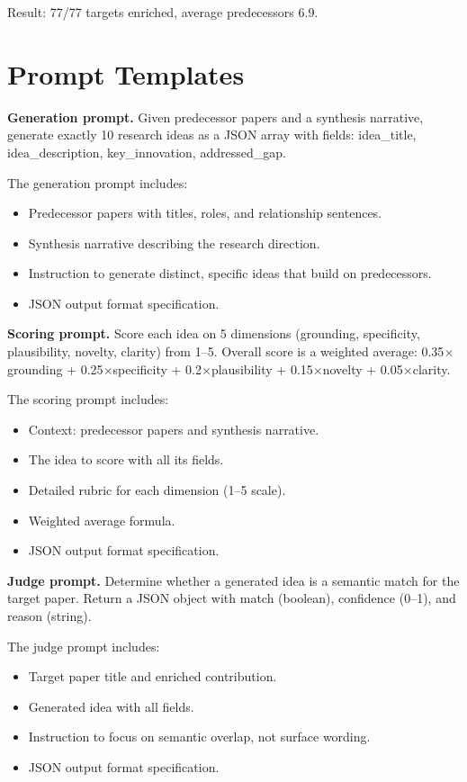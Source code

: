 \documentclass[wcp]{jmlr}
\begin{document}
Result: 77/77 targets enriched, average predecessors 6.9.

\section{Prompt Templates}\label{apd:prompts}

\textbf{Generation prompt.} Given predecessor papers and a synthesis narrative, generate exactly 10 research ideas as a JSON array with fields: idea\_title, idea\_description, key\_innovation, addressed\_gap.

The generation prompt includes:
\begin{itemize}
\item Predecessor papers with titles, roles, and relationship sentences.
\item Synthesis narrative describing the research direction.
\item Instruction to generate distinct, specific ideas that build on predecessors.
\item JSON output format specification.
\end{itemize}

\textbf{Scoring prompt.} Score each idea on 5 dimensions (grounding, specificity, plausibility, novelty, clarity) from 1--5. Overall score is a weighted average: 0.35$\times$grounding + 0.25$\times$specificity + 0.2$\times$plausibility + 0.15$\times$novelty + 0.05$\times$clarity.

The scoring prompt includes:
\begin{itemize}
\item Context: predecessor papers and synthesis narrative.
\item The idea to score with all its fields.
\item Detailed rubric for each dimension (1--5 scale).
\item Weighted average formula.
\item JSON output format specification.
\end{itemize}

\textbf{Judge prompt.} Determine whether a generated idea is a semantic match for the target paper. Return a JSON object with match (boolean), confidence (0--1), and reason (string).

The judge prompt includes:
\begin{itemize}
\item Target paper title and enriched contribution.
\item Generated idea with all fields.
\item Instruction to focus on semantic overlap, not surface wording.
\item JSON output format specification.
\end{itemize}
\end{document}
